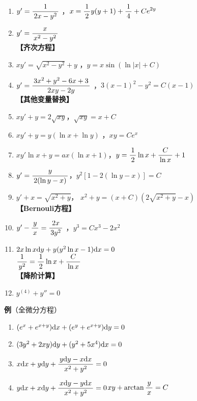 \hspace{-1ex}{\bf 【上下颠倒】}
\begin{enumerate}[(1)]
  \setlength{\itemindent}{1cm}
  \item $y'=\df{1}{2x-y^2}$ ，$x=\df12y(y+1)+\df14+Ce^{2y}$
  \item $y'=\df{x}{x^2-y^2}$\\
  {\bf 【齐次方程】}
  \item $xy'=\sqrt{x^2-y^2}+y$ ，$y=x\sin(\ln|x|+C)$
  \item $y'=\df{3x^2+y^2-6x+3}{2xy-2y}$
  ，$3(x-1)^2-y^2=C(x-1)$\\
  {\bf 【其他变量替换】}
  \item $xy'+y=2\sqrt{xy}$，$\sqrt{xy}=x+C$
  \item $xy'+y=y(\ln x+\ln y) $ ，$xy=Ce^x$
  \item $xy'\ln x+y=ax(\ln x+1)$，$y=\df12\ln x+\df C{\ln x}+1$
  \item $y'=\df{y}{2(\ln y-x)}$，$y^2[1-2(\ln y-x)]=C$
  \item $y'+x=\sqrt{x^2+y}$，
  $x^2+y=(x+C)(2\sqrt{x^2+y}-x)$\\
  {\bf 【Bernouli方程】}
  \item $y'-\df{y}{x}=\df{2x}{3y^2}$ ，$y^3=Cx^3-2x^2$
  \item $2x\ln x\d y+y(y^2\ln x-1)\d x=0$\\
  \hfill $\df1{y^2}=\df12\ln x+\df C{\ln x}$\\
  {\bf 【降阶计算】}
  \item $y^{(4)}+y''=0$
\end{enumerate}

{\bf 例}（全微分方程）
\begin{enumerate}[(1)]
  \setlength{\itemindent}{1cm}
  \item $(e^x+e^{x+y})\d x+(e^y+e^{x+y})\d y=0$
  \item $(3y^2+2xy)\d y+(y^2+5x^4)\d x=0$
  \item $x\d x+y\d y+\df{y\d y-x\d x}{x^2+y^2}=0$
  \item $y\d x+x\d y+\df{x\d y-y\d x}{x^2+y^2}=0$\dotfill$xy+\arctan\df yx=C$ 
\end{enumerate}

